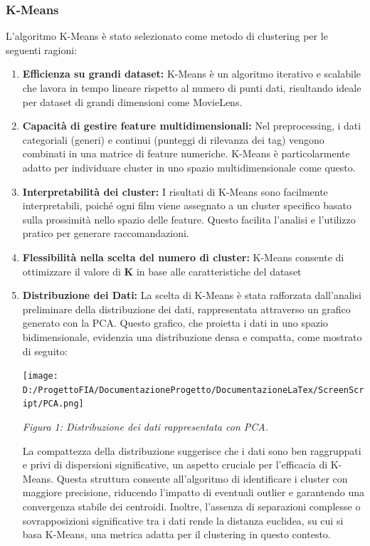 \documentclass[a4paper,12pt]{article}
\begin{document}
        \subsubsection{K-Means}
	L'algoritmo K-Means è stato selezionato come metodo di clustering per le seguenti ragioni:
	\begin{enumerate}
		\item \textbf{Efficienza su grandi dataset: }K-Means è un algoritmo iterativo e scalabile che lavora in tempo lineare rispetto al numero di punti dati, risultando ideale per dataset di grandi dimensioni come MovieLens.
		\item \textbf{Capacità di gestire feature multidimensionali: }Nel preprocessing, i dati categoriali (generi) e continui (punteggi di rilevanza dei tag) vengono combinati in una matrice di feature numeriche. K-Means è particolarmente adatto per individuare cluster in uno spazio multidimensionale come questo.
		\item \textbf{Interpretabilità dei cluster: }I risultati di K-Means sono facilmente interpretabili, poiché ogni film viene assegnato a un cluster specifico basato sulla prossimità nello spazio delle feature. Questo facilita l’analisi e l’utilizzo pratico per generare raccomandazioni.
		\item \textbf{Flessibilità nella scelta del numero di cluster: }K-Means consente di ottimizzare il valore di \textbf{K} in base alle caratteristiche del dataset
\newpage
		\item \textbf{Distribuzione dei Dati: }
La scelta di K-Means è stata rafforzata dall'analisi preliminare della distribuzione dei dati, rappresentata attraverso un grafico generato con la PCA. Questo grafico, che proietta i dati in uno spazio bidimensionale, evidenzia una distribuzione densa e compatta, come mostrato di seguito:

\begin{center}
\texttt{[image: D:/ProgettoFIA/DocumentazioneProgetto/DocumentazioneLaTex/ScreenScript/PCA.png]}

\textit{Figura 1: Distribuzione dei dati rappresentata con PCA.}
\end{center}

La compattezza della distribuzione suggerisce che i dati sono ben raggruppati e privi di dispersioni significative, un aspetto cruciale per l'efficacia di K-Means. Questa struttura consente all'algoritmo di identificare i cluster con maggiore precisione, riducendo l'impatto di eventuali outlier e garantendo una convergenza stabile dei centroidi. Inoltre, l'assenza di separazioni complesse o sovrapposizioni significative tra i dati rende la distanza euclidea, su cui si basa K-Means, una metrica adatta per il clustering in questo contesto.
	\end{enumerate}
\newpage
\end{document}
